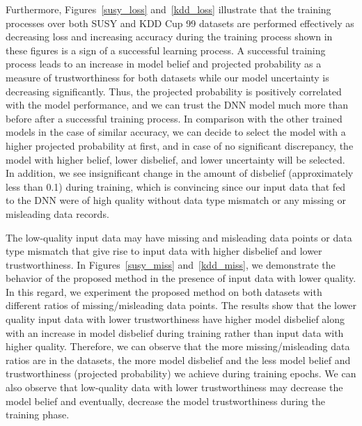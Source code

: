 {\color{blue}
Furthermore, Figures~\ref{susy_loss} and~\ref{kdd_loss} illustrate that the training processes over both SUSY and KDD Cup 99 datasets are performed effectively as decreasing loss and increasing accuracy during the training process shown in these figures is a sign of a successful learning process.}
A successful training process leads to an increase in model belief and projected probability as a measure of trustworthiness for both datasets while our model uncertainty is decreasing significantly. Thus, the projected probability is positively correlated with the model performance, and we can trust the DNN model much more than before after a successful training process. In comparison with the other trained models in the case of similar accuracy, we can decide to select the model with a higher projected probability at first, and in case of no significant discrepancy, the model with higher belief, lower disbelief, and lower uncertainty will be selected. In addition, we see insignificant change in the amount of disbelief (approximately less than 0.1) during training, which is convincing since our input data that fed to the DNN were of high quality without data type mismatch or any missing or misleading data records. 

{\color{blue} The low-quality input data may have missing and misleading data points or data type mismatch that give rise to input data with higher disbelief and lower trustworthiness. In Figures~\ref{susy_miss} and~\ref{kdd_miss}, we demonstrate the behavior of the proposed method in the presence of input data with lower quality. In this regard, we experiment the proposed method on both datasets with different ratios of missing/misleading data points. The results show that the lower quality input data with lower trustworthiness have higher model disbelief along with an increase in model disbelief during training rather than input data with higher quality. Therefore, we can observe that the more missing/misleading data ratios are in the datasets, the more model disbelief and the less model belief and trustworthiness (projected probability) we achieve during training epochs. We can also observe that low-quality data with lower trustworthiness may decrease the model belief and eventually, decrease the model trustworthiness during the training phase.         
}

